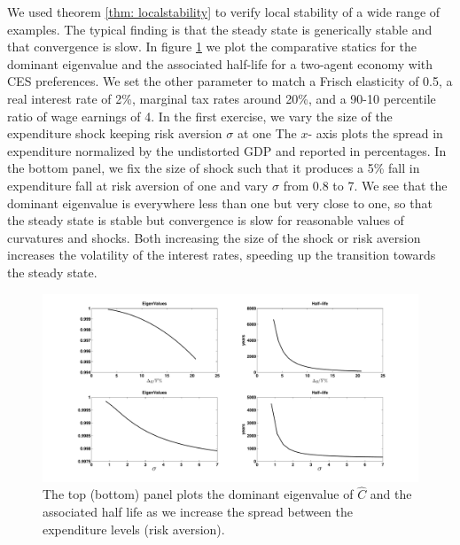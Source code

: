 \documentclass[thmsb,11pt]{article}
\begin{document}
We used theorem \ref{thm: localstability} to verify local stability of a wide range of examples. The typical finding is that the steady state is generically stable and that convergence is slow. In figure \ref{fig: Eigenvalues} we plot the comparative statics for the dominant eigenvalue and the associated  half-life for a two-agent economy with CES preferences. %
We set the other parameter to match a Frisch elasticity of 0.5,  a real interest rate of 2\%, marginal tax rates  around 20\%, and a 90-10 percentile ratio of wage earnings of 4. In the first exercise, we vary the size of the expenditure shock keeping risk aversion $\sigma$ at one The $x$- axis plots the spread in expenditure normalized by the undistorted GDP and reported in percentages. In the bottom panel, we fix the size of shock such that it produces a 5\% fall in expenditure fall at risk aversion of one and vary $\sigma$ from 0.8 to 7. We see that the dominant eigenvalue is everywhere less than one but very close to one, so that the steady state is stable but convergence is slow for reasonable values of curvatures and shocks. Both increasing the size of the shock or risk aversion increases the volatility of the interest rates, speeding up the transition towards the steady state.


  \begin{figure}[htp]
 \centering
 \includegraphics[width=\textwidth]{eigenvalues.pdf}
 \caption{The top (bottom) panel plots the dominant eigenvalue of $\hat{C}$ and the associated half life as we increase
the spread between the expenditure levels (risk aversion). }
 \label{fig: Eigenvalues}
 \end{figure}


\newpage
\end{document}
